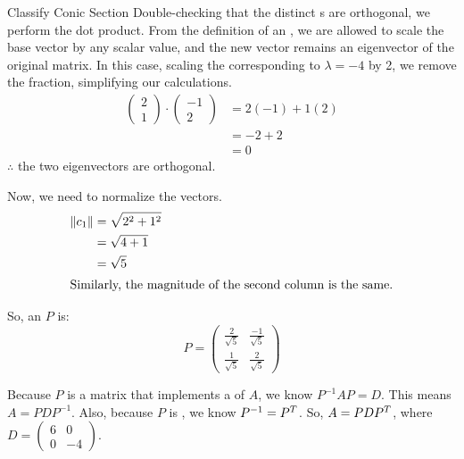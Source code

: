 \begin{example}{Classify Conic Section}
  Double-checking that the distinct s are orthogonal, we perform the dot product.
  From the definition of an , we are allowed to scale the base vector by any scalar value, and the new vector remains an eigenvector of the original matrix.
  In this case, scaling the  corresponding to $\lambda = -4$ by 2, we remove the fraction, simplifying our calculations.
  \begin{align*}
    \begin{pmatrix}
      2 \\ 1
    \end{pmatrix} \cdot
    \begin{pmatrix}
      -1 \\ 2
    \end{pmatrix} &= 2 (-1) + 1 (2) \\
                  &= -2 + 2 \\
                  &= 0
  \end{align*}
  $\therefore$ the two eigenvectors are orthogonal.

  Now, we need to normalize the vectors.
  \begin{align*}
    \lVert c_{1} \rVert &= \sqrt{2^{2} + 1^{2}} \\
                      &= \sqrt{4 + 1} \\
                      &= \sqrt{5} \\
    \intertext{Similarly, the magnitude of the second column is the same.}
  \end{align*}

  So, an  $P$ is:
  \begin{equation*}
    P =
    \begin{pmatrix}
      \frac{2}{\sqrt{5}} & \frac{-1}{\sqrt{5}} \\
      \frac{1}{\sqrt{5}} & \frac{2}{\sqrt{5}}
    \end{pmatrix}
  \end{equation*}

  Because $P$ is a matrix that implements a  of $A$, we know $P^{-1} A P = D$.
  This means $A = P D P^{-1}$.
  Also, because $P$ is , we know $P^{-1} = {P}^{T}$.
  So, $A = P D {P}^{T}$, where $D =
  \begin{pmatrix}
    6 & 0 \\
    0 & -4
  \end{pmatrix}$.


\end{example}
